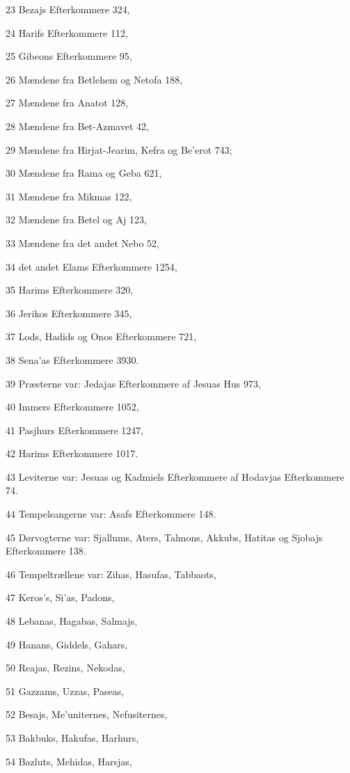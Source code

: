 \par 23 Bezajs Efterkommere 324,
\par 24 Harifs Efterkommere 112,
\par 25 Gibeons Efterkommere 95,
\par 26 Mændene fra Betlehem og Netofa 188,
\par 27 Mændene fra Anatot 128,
\par 28 Mændene fra Bet-Azmavet 42,
\par 29 Mændene fra Hirjat-Jearim, Kefra og Be'erot 743;
\par 30 Mændene fra Rama og Geba 621,
\par 31 Mændene fra Mikmas 122,
\par 32 Mændene fra Betel og Aj 123,
\par 33 Mændene fra det andet Nebo 52,
\par 34 det andet Elams Efterkommere 1254,
\par 35 Harims Efterkommere 320,
\par 36 Jerikos Efterkommere 345,
\par 37 Lods, Hadids og Onos Efterkommere 721,
\par 38 Sena'as Efterkommere 3930.
\par 39 Præsterne var: Jedajas Efterkommere af Jesuas Hus 973,
\par 40 Immers Efterkommere 1052,
\par 41 Pasjhurs Efterkommere 1247,
\par 42 Harims Efterkommere 1017.
\par 43 Leviterne var: Jesuas og Kadmiels Efterkommere af Hodavjas Efterkommere 74.
\par 44 Tempelsangerne var: Asafs Efterkommere 148.
\par 45 Dørvogterne var: Sjallums, Aters, Talmons, Akkubs, Hatitas og Sjobajs Efterkommere 138.
\par 46 Tempeltrællene var: Zihas, Hasufas, Tabbaots,
\par 47 Keros's, Si'as, Padons,
\par 48 Lebanas, Hagabas, Salmajs,
\par 49 Hanans, Giddels, Gahars,
\par 50 Reajas, Rezins, Nekodas,
\par 51 Gazzams, Uzzas, Paseas,
\par 52 Besajs, Me'uniternes, Nefusiternes,
\par 53 Bakbuks, Hakufas, Harhurs,
\par 54 Bazluts, Mehidas, Harsjas,
